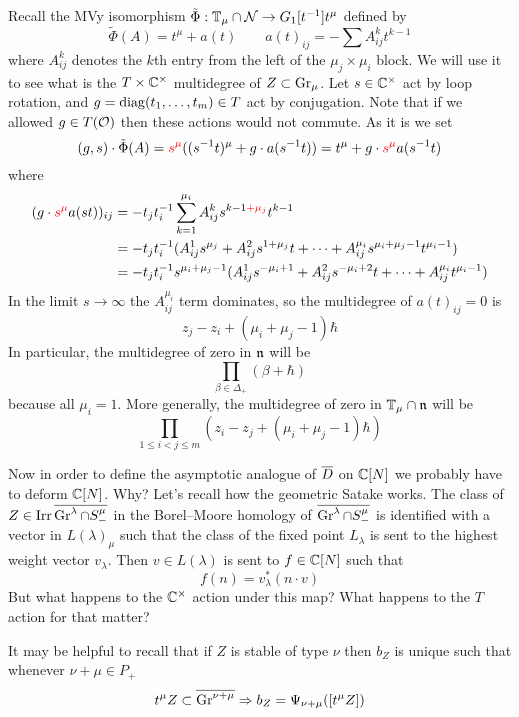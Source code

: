 \documentclass[11pt]{article}
\begin{document}
Recall the MVy isomorphism $\tilde\Phi : \mathbb T_\mu\cap\mathcal N \to G_1[t^{-1}]t^\mu$ defined by
\begin{equation}
    \tilde\Phi(A) = t^\mu + a(t) \qquad a(t)_{ij} = -\sum A_{ij}^k t^{k-1}
\end{equation}
where $A_{ij}^k$ denotes the $k$th entry from the left of the $\mu_j\times\mu_i$ block. We will use it to see what is the $T\times\mathbb C^\times$ multidegree of $Z\subset\operatorname{Gr}_\mu$. Let $s\in\mathbb C^\times$ act by loop rotation, and $g = \operatorname{diag}(t_1,\dots,t_m)\in T$ act by conjugation. Note that if we allowed $g\in T(\mathcal O)$ then these actions would not commute. As it is we set  
$$
(g,s) \cdot \tilde\Phi(A) = {\color{red} s^{\mu}}((s^{-1}t)^\mu + g\cdot a(s^{-1}t)) = t^\mu + g\cdot {\color{red} s^{\mu}} a(s^{-1}t) 
$$
where 
$$
\begin{aligned}
(g\cdot {\color{red} s^{\mu}}a(st))_{ij} &= - t_jt_i^{-1}\sum_{k=1}^{\mu_i} A_{ij}^k s^{k-1{\color{red}+\mu_j}}t^{k-1} \\
&= -t_jt_i^{-1}(A_{ij}^1 s^{\mu_j} + A_{ij}^2 s^{1 + \mu_j}t + \cdots + A_{ij}^{\mu_i}s^{\mu_i + \mu_j - 1}t^{\mu_i - 1}) \\
&= -t_jt_i^{-1}s^{\mu_i + \mu_j - 1}(A_{ij}^1 s^{-\mu_i + 1} + A_{ij}^2 s^{-\mu_i + 2}t + \cdots + A_{ij}^{\mu_i}t^{\mu_i - 1})
\end{aligned}
$$
In the limit $s\to \infty$ the $A_{ij}^{\mu_i}$ term dominates, so the multidegree of $a(t)_{ij}=0$ is 
$$z_j - z_i + (\mu_i + \mu_j - 1)\hbar$$
In particular, the multidegree of zero in $\mathfrak n$ will be 
$$
\prod_{\beta\in\Delta_+} (\beta + \hbar)
$$
because all $\mu_i = 1$. More generally, the multidegree of zero in $\mathbb T_\mu\cap\mathfrak n$ will be 
$$
\prod_{1\le i<j\le m} (z_i - z_j + (\mu_i + \mu_j - 1)\hbar)
$$

Now in order to define the asymptotic analogue of $\overline{D}$ on $\mathbb C[N]$ we probably have to deform $\mathbb C[N]$. Why? Let's recall how the geometric Satake works. The class of $Z\in\operatorname{Irr}\overline{\operatorname{Gr}^\lambda\cap S^\mu_-}$ in the Borel--Moore homology of $\overline{\operatorname{Gr}^\lambda\cap S^\mu_-}$ is identified with a vector in $L(\lambda)_\mu$ such that the class of the fixed point $L_\lambda$ is sent to the highest weight vector $v_\lambda$. Then $v\in L(\lambda)$ is sent to $f\in\mathbb C[N]$ such that 
$$
f(n) = v_\lambda^\ast(n\cdot v)
$$
But what happens to the $\mathbb C^\times$ action under this map? What happens to the $T$ action for that matter? 

It may be helpful to recall that if $Z$ is stable of type $\nu$ then $b_Z$ is unique such that whenever $\nu + \mu \in P_+$ 
$$
t^\mu Z \subset \overline{\operatorname{Gr}^{\nu + \mu }} \Rightarrow b_Z = \Psi_{\nu + \mu}([t^\mu Z])
$$
\end{document}
